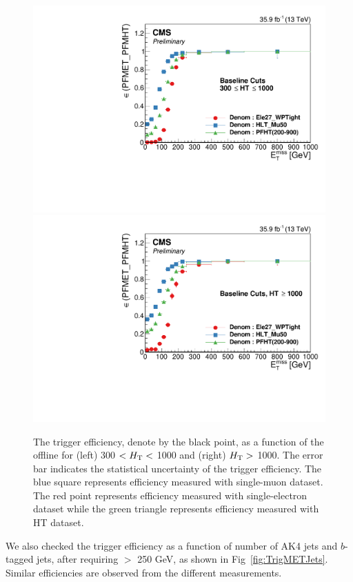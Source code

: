 \begin{figure}[tbp]
 \begin{center}
   \includegraphics[width=0.49\linewidth]{sections/mc4/EvtSelSBOpt/figures/TrigMET_HTLess1000.pdf}
   \includegraphics[width=0.49\linewidth]{sections/mc4/EvtSelSBOpt/figures/TrigMET_HTMore1000.pdf}
   \caption{ The trigger efficiency, denote by the black point, as a function
   of the offline \MET for (left) 300 $< H_{\mathrm{T}} <$ 1000 and (right) $H_{\mathrm{T}} >$ 1000.
   The error bar indicates the statistical uncertainty of the trigger
   efficiency. The blue square represents efficiency measured with
   single-muon dataset.  The red point represents efficiency measured
   with single-electron dataset while the green triangle represents
   efficiency measured with HT dataset.}
   \label{fig:TrigMETSys}
 \end{center}
\end{figure}

We also checked the trigger efficiency as a function of number of AK4 jets and $b$-tagged jets, after requiring \MET $>$ 250 GeV, as shown in
Fig~\ref{fig:TrigMETJets}. Similar efficiencies are observed from the different measurements.

